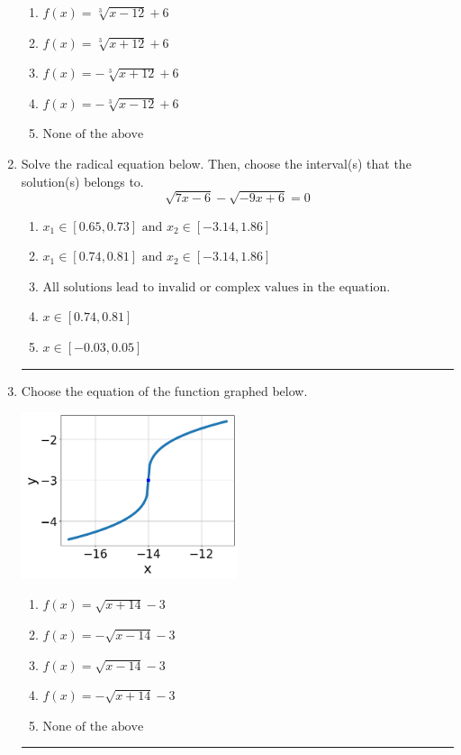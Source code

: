 \documentclass[14pt]{extbook}
\newcommand{\litem}[1]{\item#1\hspace*{-1cm}\rule{\textwidth}{0.4pt}}
\begin{document}
\begin{enumerate}
{\begin{center}
\end{center}
\begin{enumerate}[label=\Alph*.]
\item \( f(x) = \sqrt[3]{x - 12} + 6 \)
\item \( f(x) = \sqrt[3]{x + 12} + 6 \)
\item \( f(x) = - \sqrt[3]{x + 12} + 6 \)
\item \( f(x) = - \sqrt[3]{x - 12} + 6 \)
\item \( \text{None of the above} \)

\end{enumerate} }
\litem{
Solve the radical equation below. Then, choose the interval(s) that the solution(s) belongs to.\[ \sqrt{7 x - 6} - \sqrt{-9 x + 6} = 0 \]\begin{enumerate}[label=\Alph*.]
\item \( x_1 \in [0.65, 0.73] \text{ and } x_2 \in [-3.14,1.86] \)
\item \( x_1 \in [0.74, 0.81] \text{ and } x_2 \in [-3.14,1.86] \)
\item \( \text{All solutions lead to invalid or complex values in the equation.} \)
\item \( x \in [0.74,0.81] \)
\item \( x \in [-0.03,0.05] \)

\end{enumerate} }
\litem{
Choose the equation of the function graphed below.
\begin{center}
    \includegraphics[width=0.5\textwidth]{../Figures/radicalGraphToEquationCopyC.png}
\end{center}
\begin{enumerate}[label=\Alph*.]
\item \( f(x) = \sqrt{x + 14} - 3 \)
\item \( f(x) = - \sqrt{x - 14} - 3 \)
\item \( f(x) = \sqrt{x - 14} - 3 \)
\item \( f(x) = - \sqrt{x + 14} - 3 \)
\item \( \text{None of the above} \)


\end{enumerate}}
\end{enumerate}
\end{document}
